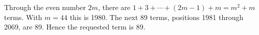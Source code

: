 Through the even number $2m$, there are $1+3+\cdots+(2m-1)+m=m^2+m$ terms. With $m=44$ this is 1980. The next 89 terms, positions 1981 through 2069, are 89. Hence the requested term is $\boxed{89}$.
